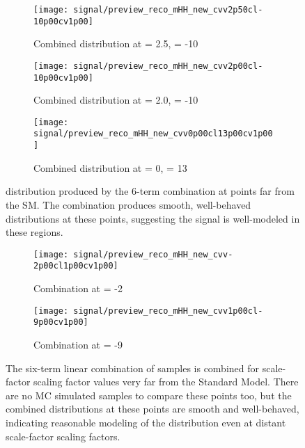     \begin{figure}[tbh]
        \centering
        \begin{subfigure}{0.32\textwidth}
            \texttt{[image: signal/preview\_reco\_mHH\_new\_cvv2p50cl-10p00cv1p00]}
            \captionsetup{justification=centering} \caption{Combined \mhh distribution at \kvv = 2.5, \kl = -10}
        \end{subfigure}
        \begin{subfigure}{0.32\textwidth}
            \texttt{[image: signal/preview\_reco\_mHH\_new\_cvv2p00cl-10p00cv1p00]}
            \captionsetup{justification=centering} \caption{Combined \mhh distribution at \kvv = 2.0, \kl = -10}
        \end{subfigure}
        \begin{subfigure}{0.32\textwidth}
            \texttt{[image: signal/preview\_reco\_mHH\_new\_cvv0p00cl13p00cv1p00]}
            \captionsetup{justification=centering} \caption{Combined \mhh distribution at \kvv = 0, \kl = 13}
        \end{subfigure}
        \caption{
            \mhh distribution produced by the 6-term combination at points far from the SM.
            The combination produces smooth, well-behaved distributions at these points,
                suggesting the signal is well-modeled in these regions.
        }
        \label{fig:vbf_hh_6term_preview}
    \end{figure}

    \begin{figure}[tbh]
    	\centering
        \begin{subfigure}{0.44\textwidth}
            \texttt{[image: signal/preview\_reco\_mHH\_new\_cvv-2p00cl1p00cv1p00]}
            \captionsetup{justification=centering} \caption{Combination at  \kvv = -2}
        \end{subfigure}
        \begin{subfigure}{0.44\textwidth}
            \texttt{[image: signal/preview\_reco\_mHH\_new\_cvv1p00cl-9p00cv1p00]}
            \captionsetup{justification=centering} \caption{Combination at  \kl = -9}
        \end{subfigure}
        \caption{
            The six-term linear combination of samples is combined for scale-factor scaling factor values very far from the Standard Model.
            There are no MC simulated samples to compare these points too, but the combined distributions at these points are smooth and well-behaved,
                indicating reasonable modeling of the distribution even at distant scale-factor scaling factors.
        }
        \label{fig:vbf_hh_preview}
    \end{figure}


